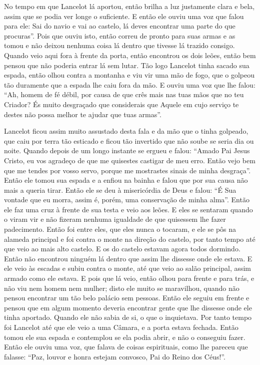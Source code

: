 No tempo em que Lancelot lá aportou, então brilha a luz justamente clara e
bela, assim que se podia ver longe o suficiente. E então ele ouviu uma voz que
falou para ele: Sai do navio e vai ao castelo, lá deves encontrar uma parte do
que procuras”. Pois que ouviu isto, então correu de pronto para suas
armas e as tomou e não deixou nenhuma coisa lá dentro que tivesse lá trazido
consigo. Quando veio aqui fora à frente da porta, então encontrou os dois
leões, então bem pensou que não poderia entrar lá sem lutar. Tão logo
Lancelot tinha sacado sua espada, então olhou contra a montanha e viu vir uma
mão de fogo, que o golpeou tão duramente que a espada lhe caiu fora da mão. E
ouviu uma voz que lhe falou: “Ah, homem de fé débil, por causa de que crês mais
nas tuas mãos que no teu Criador? És muito desgraçado que considerais que
Aquele em cujo serviço te destes não possa melhor te ajudar que tuas armas”. 

Lancelot ficou assim muito assustado desta fala e da mão que o tinha golpeado,
que caiu por terra tão esticado e ficou tão invertido que não soube se seria
dia ou noite. Quando depois de um longo instante se ergueu e falou: “Amado Pai
Jesus Cristo, eu vos agradeço de que me quisestes castigar de meu erro. Então
vejo bem que me tendes por vosso servo, porque me mostrastes sinais de minha
desgraça”. Então ele tomou sua espada e a enfiou na bainha e falou que por sua
causa não mais a queria tirar. Então ele se deu à misericórdia de Deus e falou:
“É Sua vontade que eu morra, assim é, porém, uma conservação de minha alma”.
Então ele faz uma cruz à frente de sua testa e veio aos leões. E eles se
sentaram quando o viram vir e não fizeram nenhuma igualdade de que quisessem
lhe fazer padecimento. Então foi entre eles, que eles nunca o tocaram, e ele se
pôs na alameda principal e foi contra o monte na direção do castelo, por tanto
tempo até que veio ao mais alto castelo. E os do castelo estavam agora todos
dormindo. Então não encontrou ninguém lá dentro que assim lhe dissesse onde ele
estava. E ele veio às escadas e subiu contra o monte, até que veio ao salão
principal, assim armado como ele estava. E pois que lá veio, então olhou para
frente e para trás, e não viu nem homem nem mulher; disto ele muito se
maravilhou, quando não pensou encontrar um tão belo palácio sem pessoas. Então
ele seguiu em frente e pensou que em algum momento deveria encontrar gente que
lhe dissesse onde ele tinha aportado. Quando ele não sabia de si, o que o
inquietava. Por tanto tempo foi Lancelot até que ele veio a uma Câmara, e a
porta estava fechada. Então tomou ele sua espada e contemplou se ela podia
abrir, e não o conseguiu fazer. Então ele ouviu uma voz, que falava de coisas
espirituais, como lhe pareceu que falasse: “Paz, louvor e honra estejam
convosco, Pai do Reino dos Céus!”.

